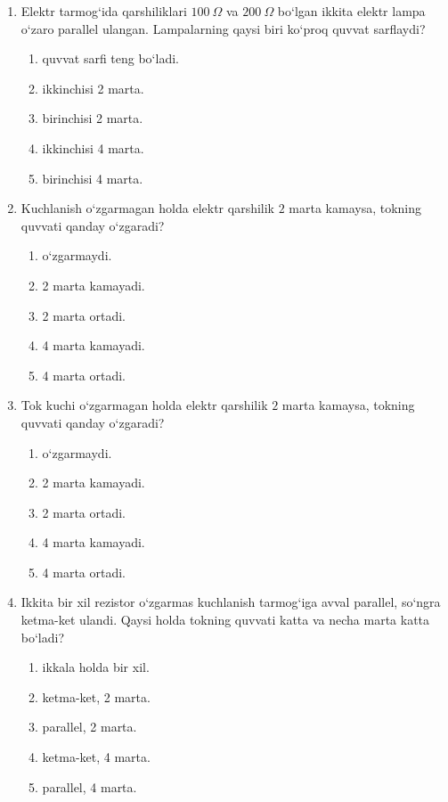 \begin{enumerate}
\item Elektr tarmog‘ida qarshiliklari $100~\Omega$ va $200~\Omega$ bo‘lgan ikkita elektr lampa o‘zaro parallel ulangan. Lampalarning qaysi biri ko‘proq quvvat sarflaydi?
\begin{enumerate}[label=\Alph*)]
\item quvvat sarfi teng bo‘ladi.
\item ikkinchisi 2 marta.
\item birinchisi 2 marta.
\item ikkinchisi 4 marta.
\item birinchisi 4 marta.
\end{enumerate}

\item Kuchlanish o‘zgarmagan holda elektr qarshilik $2$ marta kamaysa, tokning quvvati qanday o‘zgaradi?
\begin{enumerate}[label=\Alph*)]
\item o‘zgarmaydi.
\item 2 marta kamayadi.
\item 2 marta ortadi.
\item 4 marta kamayadi.
\item 4 marta ortadi.
\end{enumerate}

\item Tok kuchi o‘zgarmagan holda elektr qarshilik $2$ marta kamaysa, tokning quvvati qanday o‘zgaradi?
\begin{enumerate}[label=\Alph*)]
\item o‘zgarmaydi.
\item 2 marta kamayadi.
\item 2 marta ortadi.
\item 4 marta kamayadi.
\item 4 marta ortadi.
\end{enumerate}

\item Ikkita bir xil rezistor o‘zgarmas kuchlanish tarmog‘iga avval parallel, so‘ngra ketma-ket ulandi. Qaysi holda tokning quvvati katta va necha marta katta bo‘ladi?
\begin{enumerate}[label=\Alph*)]
\item ikkala holda bir xil.
\item ketma-ket, 2 marta.
\item parallel, 2 marta.
\item ketma-ket, 4 marta.
\item parallel, 4 marta.
\end{enumerate}


\end{enumerate}

